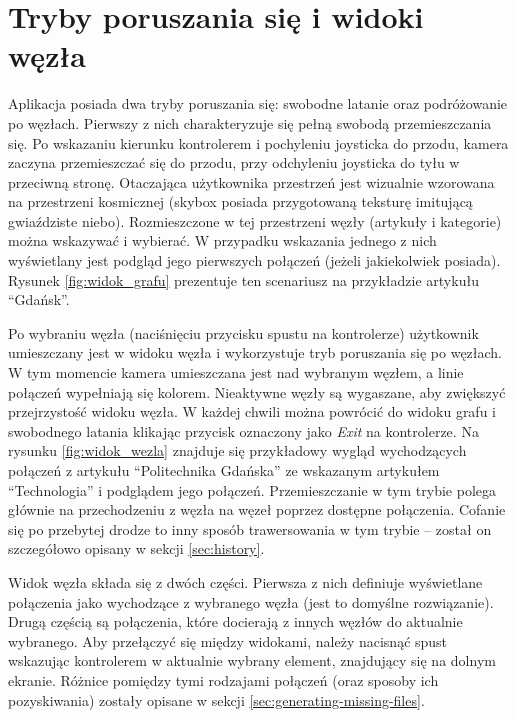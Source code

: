 \section{Tryby poruszania się i widoki węzła}
\label{sec:tryby-widoki}
Aplikacja posiada dwa tryby poruszania się: swobodne latanie oraz podróżowanie po węzłach. Pierwszy z nich charakteryzuje się pełną swobodą przemieszczania się. Po wskazaniu kierunku kontrolerem i pochyleniu joysticka do przodu, kamera zaczyna przemieszczać się do przodu, przy odchyleniu joysticka do tyłu w przeciwną stronę. Otaczająca użytkownika przestrzeń jest wizualnie wzorowana na przestrzeni kosmicznej (skybox posiada przygotowaną teksturę imitującą gwiaździste niebo). Rozmieszczone w tej przestrzeni węzły (artykuły i kategorie) można wskazywać i wybierać. W przypadku wskazania jednego z nich wyświetlany jest podgląd jego pierwszych połączeń (jeżeli jakiekolwiek posiada). Rysunek \ref{fig:widok_grafu} prezentuje ten scenariusz na przykładzie artykułu ``Gdańsk''.


Po wybraniu węzła (naciśnięciu przycisku spustu na kontrolerze) użytkownik umieszczany jest w widoku węzła i wykorzystuje tryb poruszania się po węzłach. W tym momencie kamera umieszczana jest nad wybranym węzłem, a linie połączeń wypełniają się kolorem. Nieaktywne węzły są wygaszane, aby zwiększyć przejrzystość widoku węzła. W każdej chwili można powrócić do widoku grafu i swobodnego latania klikając przycisk oznaczony jako \textit{Exit} na kontrolerze. Na rysunku \ref{fig:widok_wezla} znajduje się przykładowy wygląd wychodzących połączeń z artykułu ``Politechnika Gdańska'' ze wskazanym artykułem ``Technologia'' i podglądem jego połączeń. Przemieszczanie w tym trybie polega głównie na przechodzeniu z węzła na węzeł poprzez dostępne połączenia. Cofanie się po przebytej drodze to inny sposób trawersowania w tym trybie – został on szczegółowo opisany w sekcji \ref{sec:history}.


Widok węzła składa się z dwóch części. Pierwsza z nich definiuje wyświetlane połączenia jako wychodzące z wybranego węzła (jest to domyślne rozwiązanie). Drugą częścią są połączenia, które docierają z innych węzłów do aktualnie wybranego. Aby przełączyć się między widokami, należy nacisnąć spust wskazując kontrolerem w aktualnie wybrany element, znajdujący się na dolnym ekranie. Różnice pomiędzy tymi rodzajami połączeń (oraz sposoby ich pozyskiwania) zostały opisane w sekcji \ref{sec:generating-missing-files}.